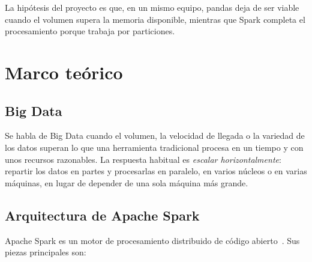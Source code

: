 \documentclass[11pt,a4paper]{article}
\begin{document}
La hipótesis del proyecto es que, en un mismo equipo, pandas deja de ser viable cuando el
volumen supera la memoria disponible, mientras que Spark completa el procesamiento porque
trabaja por particiones.

\section{Marco teórico}

\subsection{Big Data}

Se habla de Big Data cuando el volumen, la velocidad de llegada o la variedad de los datos
superan lo que una herramienta tradicional procesa en un tiempo y con unos recursos
razonables. La respuesta habitual es \emph{escalar horizontalmente}: repartir los datos en
partes y procesarlas en paralelo, en varios núcleos o en varias máquinas, en lugar de
depender de una sola máquina más grande.

\subsection{Arquitectura de Apache Spark}

Apache Spark es un motor de procesamiento distribuido de código abierto~\cite{zaharia2016,chambers2018}.
Sus piezas principales son:
\end{document}
